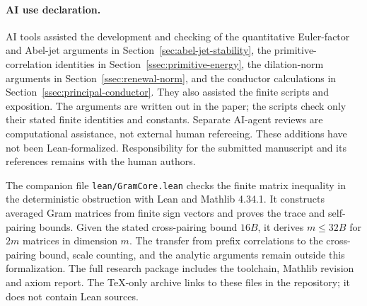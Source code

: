 \documentclass[11pt]{amsart}
\theoremstyle{definition}
\theoremstyle{remark}
\numberwithin{equation}{section}
\begin{document}
\paragraph{AI use declaration.} AI tools assisted the development and checking of the quantitative Euler-factor and Abel-jet arguments in Section~\ref{sec:abel-jet-stability}, the primitive-correlation identities in Section~\ref{ssec:primitive-energy}, the dilation-norm arguments in Section~\ref{ssec:renewal-norm}, and the conductor calculations in Section~\ref{ssec:principal-conductor}. They also assisted the finite scripts and exposition. The arguments are written out in the paper; the scripts check only their stated finite identities and constants. Separate AI-agent reviews are computational assistance, not external human refereeing. These additions have not been Lean-formalized. Responsibility for the submitted manuscript and its references remains with the human authors.

The companion file \texttt{lean/GramCore.lean} checks the finite matrix inequality in the deterministic obstruction with Lean and Mathlib 4.34.1. It constructs averaged Gram matrices from finite sign vectors and proves the trace and self-pairing bounds. Given the stated cross-pairing bound \(16B\), it derives \(m\le32B\) for \(2m\) matrices in dimension \(m\). The transfer from prefix correlations to the cross-pairing bound, scale counting, and the analytic arguments remain outside this formalization. The full research package includes the toolchain, Mathlib revision and axiom report. The TeX-only archive links to these files in the repository; it does not contain Lean sources.
\end{document}
